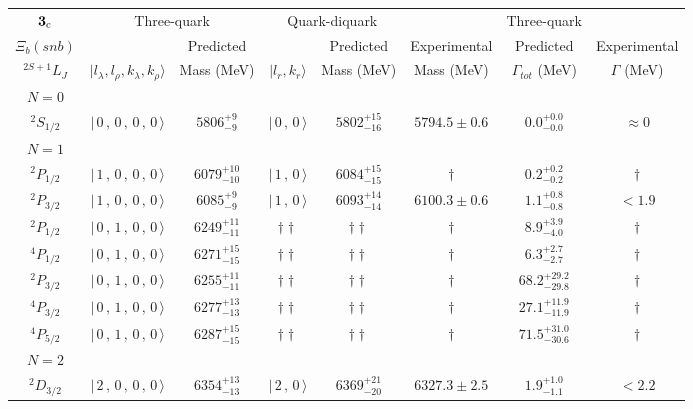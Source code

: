 \begin{tabular}{c| c c c c c c c}\hline \hline
${\bf {3}}_{\rm c}$ & \multicolumn{2}{c}{Three-quark} &  \multicolumn{2}{c}{Quark-diquark}   &    &  Three-quark  &\\ 
$\Xi_{b}(snb)$ &   & Predicted  &   &  Predicted   &  Experimental &  Predicted            & Experimental \\ 
 $^{2S+1}L_{J}$ & $\vert l_{\lambda}, l_{\rho}, k_{\lambda}, k_{\rho} \rangle$ & Mass (MeV)  & $\vert l_{r}, k_{r} \rangle$  &  Mass (MeV)   &  Mass (MeV)   &  $\Gamma_{tot}$ (MeV) & $\Gamma$ (MeV) \\ \hline
\hline
 $N=0$  &  &  &  &  &  \\ 
$^{2}S_{1/2}$ & $\vert \,0\,,\,0\,,\,0\,,\,0 \,\rangle $ & $5806^{+9}_{-9}$ & $\vert \,0\,,\,0 \,\rangle$ & $5802^{+15}_{-16}$ & $5794.5\pm 0.6$ & $0.0^{+0.0}_{-0.0}$ & $\approx 0$ \\ 
\hline
 $N=1$  &  &  &  &  &  \\ 
$^{2}P_{1/2}$ & $\vert \,1\,,\,0\,,\,0\,,\,0 \,\rangle $ & $6079^{+10}_{-10}$ & $\vert \,1\,,\,0 \,\rangle$ & $6084^{+15}_{-15}$ & $\dagger$ & $0.2^{+0.2}_{-0.2}$ & $\dagger$ \\ 
$^{2}P_{3/2}$ & $\vert \,1\,,\,0\,,\,0\,,\,0 \,\rangle $ & $6085^{+9}_{-9}$ & $\vert \,1\,,\,0 \,\rangle$ & $6093^{+14}_{-14}$ & $6100.3\pm 0.6$ & $1.1^{+0.8}_{-0.8}$ & $<1.9$ \\ 
$^{2}P_{1/2}$ & $\vert \,0\,,\,1\,,\,0\,,\,0 \,\rangle $ & $6249^{+11}_{-11}$ & $\dagger\dagger$ & $\dagger\dagger$ & $\dagger$ & $8.9^{+3.9}_{-4.0}$ & $\dagger$ \\ 
$^{4}P_{1/2}$ & $\vert \,0\,,\,1\,,\,0\,,\,0 \,\rangle $ & $6271^{+15}_{-15}$ & $\dagger\dagger$ & $\dagger\dagger$ & $\dagger$ & $6.3^{+2.7}_{-2.7}$ & $\dagger$ \\ 
$^{2}P_{3/2}$ & $\vert \,0\,,\,1\,,\,0\,,\,0 \,\rangle $ & $6255^{+11}_{-11}$ & $\dagger\dagger$ & $\dagger\dagger$ & $\dagger$ & $68.2^{+29.2}_{-29.8}$ & $\dagger$ \\ 
$^{4}P_{3/2}$ & $\vert \,0\,,\,1\,,\,0\,,\,0 \,\rangle $ & $6277^{+13}_{-13}$ & $\dagger\dagger$ & $\dagger\dagger$ & $\dagger$ & $27.1^{+11.9}_{-11.9}$ & $\dagger$ \\ 
$^{4}P_{5/2}$ & $\vert \,0\,,\,1\,,\,0\,,\,0 \,\rangle $ & $6287^{+15}_{-15}$ & $\dagger\dagger$ & $\dagger\dagger$ & $\dagger$ & $71.5^{+31.0}_{-30.6}$ & $\dagger$ \\ 
\hline
 $N=2$  &  &  &  &  &  \\ 
$^{2}D_{3/2}$ & $\vert \,2\,,\,0\,,\,0\,,\,0 \,\rangle $ & $6354^{+13}_{-13}$ & $\vert \,2\,,\,0 \,\rangle$ & $6369^{+21}_{-20}$ & $6327.3\pm 2.5$ & $1.9^{+1.0}_{-1.1}$ & $<2.2$ \\ 

\end{tabular}
